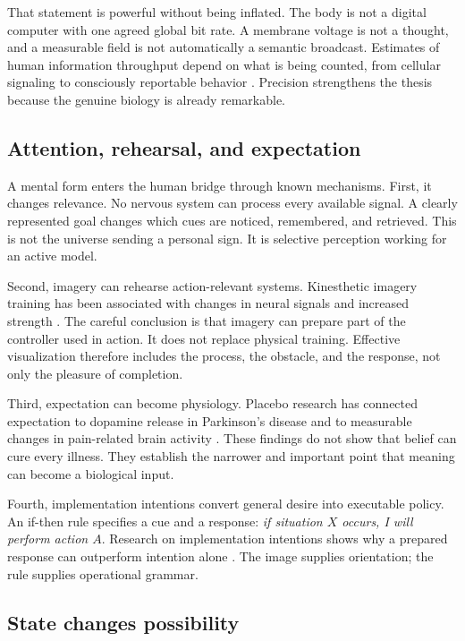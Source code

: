 \documentclass[11pt]{article}
\theoremstyle{plain}
\theoremstyle{definition}
\begin{document}
That statement is powerful without being inflated. The body is not a digital computer
with one agreed global bit rate. A membrane voltage is not a thought, and a measurable
field is not automatically a semantic broadcast. Estimates of human information
throughput depend on what is being counted, from cellular signaling to consciously
reportable behavior \citep{kandel2021principles,zheng2025bits,sauerbrei2025bits}.
Precision strengthens the thesis because the genuine biology is already remarkable.

\subsection*{Attention, rehearsal, and expectation}

A mental form enters the human bridge through known mechanisms. First, it changes
relevance. No nervous system can process every available signal. A clearly represented
goal changes which cues are noticed, remembered, and retrieved. This is not the
universe sending a personal sign. It is selective perception working for an active
model.

Second, imagery can rehearse action-relevant systems. Kinesthetic imagery training has
been associated with changes in neural signals and increased strength
\citep{yao2013imagery}. The careful conclusion is that imagery can prepare part of the
controller used in action. It does not replace physical training. Effective
visualization therefore includes the process, the obstacle, and the response, not only
the pleasure of completion.

Third, expectation can become physiology. Placebo research has connected expectation
to dopamine release in Parkinson's disease and to measurable changes in pain-related
brain activity \citep{delafuente2001placebo,wager2004placebo}. These findings do not
show that belief can cure every illness. They establish the narrower and important
point that meaning can become a biological input.

Fourth, implementation intentions convert general desire into executable policy. An
if-then rule specifies a cue and a response: \emph{if situation \(X\) occurs, I will
perform action \(A\)}. Research on implementation intentions shows why a prepared
response can outperform intention alone \citep{sheeran2005implementation}. The image
supplies orientation; the rule supplies operational grammar.

\subsection*{State changes possibility}
\end{document}
